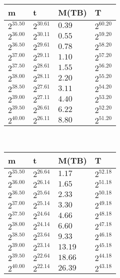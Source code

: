 \begin{tabular}{llll}
m & t & M(TB) & T \\ \hline
$2^{35.50}$ & $2^{30.61}$ & $0.39$ & $2^{60.20}$ \\
$2^{36.00}$ & $2^{30.11}$ & $0.55$ & $2^{59.20}$ \\
$2^{36.50}$ & $2^{29.61}$ & $0.78$ & $2^{58.20}$ \\
$2^{37.00}$ & $2^{29.11}$ & $1.10$ & $2^{57.20}$ \\
$2^{37.50}$ & $2^{28.61}$ & $1.55$ & $2^{56.20}$ \\
$2^{38.00}$ & $2^{28.11}$ & $2.20$ & $2^{55.20}$ \\
$2^{38.50}$ & $2^{27.61}$ & $3.11$ & $2^{54.20}$ \\
$2^{39.00}$ & $2^{27.11}$ & $4.40$ & $2^{53.20}$ \\
$2^{39.50}$ & $2^{26.61}$ & $6.22$ & $2^{52.20}$ \\
$2^{40.00}$ & $2^{26.11}$ & $8.80$ & $2^{51.20}$ \\
\end{tabular}
 \ 
\begin{tabular}{llll}
m & t & M(TB) & T \\ \hline
$2^{35.50}$ & $2^{26.64}$ & $1.17$ & $2^{52.18}$ \\
$2^{36.00}$ & $2^{26.14}$ & $1.65$ & $2^{51.18}$ \\
$2^{36.50}$ & $2^{25.64}$ & $2.33$ & $2^{50.18}$ \\
$2^{37.00}$ & $2^{25.14}$ & $3.30$ & $2^{49.18}$ \\
$2^{37.50}$ & $2^{24.64}$ & $4.66$ & $2^{48.18}$ \\
$2^{38.00}$ & $2^{24.14}$ & $6.60$ & $2^{47.18}$ \\
$2^{38.50}$ & $2^{23.64}$ & $9.33$ & $2^{46.18}$ \\
$2^{39.00}$ & $2^{23.14}$ & $13.19$ & $2^{45.18}$ \\
$2^{39.50}$ & $2^{22.64}$ & $18.66$ & $2^{44.18}$ \\
$2^{40.00}$ & $2^{22.14}$ & $26.39$ & $2^{43.18}$ \\
\end{tabular}
 \ 
